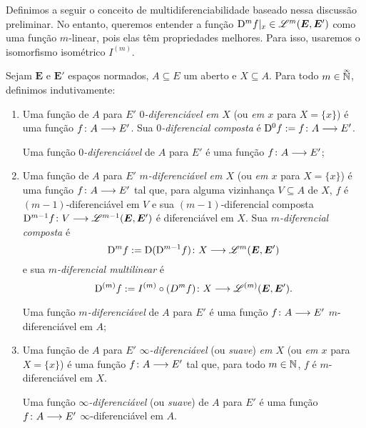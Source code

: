Definimos a seguir o conceito de multidiferenciabilidade baseado nessa discussão preliminar. No entanto, queremos entender a função $\mathrm{D}^m f|_x \in \mathscr{L}^m(\bm E, \bm E')$ como uma função $m$-linear, pois elas têm propriedades melhores. Para isso, usaremos o isomorfismo isométrico $I^{(m)}$.
\begin{definition}[Multidiferenciabilidade]
\label{def:multidiferenciabilidade}
Sejam $\bm E$ e $\bm E'$ espaços normados, $A \subseteq E$ um aberto e $X \subseteq A$. Para todo $m \in \accentset{\infty}{\mathbb{N}}$, definimos indutivamente:
	\begin{enumerate}
	\item Uma função de $A$ para $E'$ \emph{$0$-diferenciável} \emph{em $X$} (ou \emph{em $x$} para $X = \{x\}$) é uma função $f\colon \allowbreak A \longrightarrow E'$. Sua \emph{$0$-diferencial composta} é $\mathrm{D}^0 f := f\colon \allowbreak A \longrightarrow E'$.

	Uma função \emph{$0$-diferenciável} de $A$ para $E'$ é uma função $f\colon \allowbreak A \longrightarrow E'$;

	\item Uma função de $A$ para $E'$ \emph{$m$-diferenciável} \emph{em $X$} (ou \emph{em $x$} para $X = \{x\}$) é uma função $f\colon \allowbreak A \longrightarrow E'$ tal que, para alguma vizinhança $V \subseteq A$ de $X$, $f$ é $(m-1)$-diferenciável em $V$ e sua $(m-1)$-diferencial composta $\mathrm{D}^{m-1} f\colon \allowbreak V \longrightarrow \mathscr{L}^{m-1}(\bm E, \bm E')$ é diferenciável em $X$. Sua \emph{$m$-diferencial composta} é
		\begin{equation*}
		\mathrm{D}^m f := \mathrm{D} (\mathrm{D}^{m-1} f)\colon \allowbreak X \longrightarrow \mathscr{L}^m(\bm E, \bm E')
		\end{equation*}
	e sua \emph{$m$-diferencial multilinear} é
		\begin{equation*}
		\mathrm{D}^{(m)} f := I^{(m)} \circ (D^m f)\colon \allowbreak X \longrightarrow \mathscr{L}^{(m)}(\bm E, \bm E').
		\end{equation*}

	Uma função \emph{$m$-diferenciável} de $A$ para $E'$ é uma função $f\colon \allowbreak A \longrightarrow E'$ $m$-diferenciável em $A$;

	\item Uma função de $A$ para $E'$ \emph{$\infty$-diferenciável} (ou \emph{suave}) \emph{em $X$} (ou \emph{em $x$} para $X = \{x\}$) é uma função $f\colon \allowbreak A \longrightarrow E'$ tal que, para todo $m \in \mathbb{N}$, $f$ é $m$-diferenciável em $X$.

	Uma função \emph{$\infty$-diferenciável} (ou \emph{suave}) de $A$ para $E'$ é uma função $f\colon \allowbreak A \longrightarrow E'$ $\infty$-diferenciável em $A$.
	\end{enumerate}
\end{definition}

